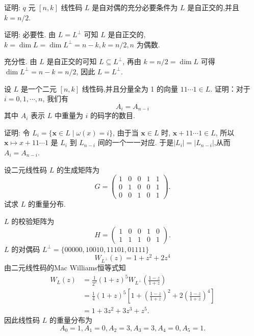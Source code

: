 \begin{exercise}
 证明: $ q $ 元 $ [n, k] $ 线性码 $ L $ 是自对偶的充分必要条件为 $ L $ 是自正交的,并且 $ k=n / 2 $.
\end{exercise}
\begin{solution}
    证明: 必要性. 由 $ L=L ^\perp $ 可知 $ L $ 是自正交的, $ k=\operatorname{dim} L=\operatorname{dim} L^{\perp}=n-k, k=n / 2, n $ 为偶数.

充分性. 由 $ L $ 是自正交的可知 $ L \subseteq L^{\perp} $, 再由 $ k=n / 2=\operatorname{dim} L $ 可得 $ \operatorname{dim} L^{\perp}=n-k=n / 2 $, 因此 $ L=L^{\perp} $.
\end{solution}




\begin{exercise}
设 $ L $ 是一个二元 $ [n, k] $ 线性码,并且分量全为 1 的向量 $ 11 \cdots 1 \in L $. 证明：对于 $ i=0,1, \cdots, n $, 我们有
$$
A_{i}=A_{n-i}
$$
其中 $ A_{i} $ 表示 $ L $ 中重量为 $ i $ 的码字的数目.
\end{exercise}
\begin{solution}
    证明: 令 $ L_{i}=\{\boldsymbol{x} \in L \mid \omega(x)=i\} $, 由于当 $ \boldsymbol{x }\in L $ 时, $ \boldsymbol{x}+11 \cdots 1 \in L $, 所以 $ \boldsymbol{x} \longmapsto x+11 \cdots 1 $ 是 $ L_{i} $ 到 $ L_{n-i} $ 间的一个一一对应. 于是$|L_{i}|=|L_{n-i}|$,从而 $ A_{i}=A_{n-i} $.
\end{solution}



\begin{exercise}
 设二元线性码 $ L $ 的生成矩阵为
$$
G=\left(\begin{array}{lllll}
1 & 0 & 0 & 1 & 1 \\
0 & 1 & 0 & 0 & 1 \\
0 & 0 & 1 & 0 & 1
\end{array}\right) .
$$
试求 $ L $ 的重量分布.
\end{exercise}
\begin{solution}
$ L $ 的校验矩阵为
$$
H=\left(\begin{array}{lllll}
1 & 0 & 0 & 1 & 0 \\
1 & 1 & 1 & 0 & 1
\end{array}\right) .
$$
$ L $ 的对偶码 $ L^{\perp}=\{00000,10010,11101,01111\} $
$$
W_{L^{\perp}}(z)=1+z^{2}+2 z^{4}
$$
由二元线性码的Mac Williams恒等式知
$$
\begin{aligned}
W_{L}(z) & =\frac{1}{2^{2}}(1+z)^{5} W_{L^{\perp}}\left(\frac{1-z}{1+z}\right) \\
& =\frac{1}{4}(1+z)^{5}\left[1+\left(\frac{1-z}{1+z}\right)^{2}+2\left(\frac{1-z}{1+z}\right)^{4}\right] \\
& =1+3 z^{2}+3 z^{3}+z^{5} .
\end{aligned}
$$
因此线性码 $ L $ 的重量分布为
$$
A_{0}=1, A_{1}=0, A_{2}=3, A_{3}=3, A_{4}=0, A_{5}=1 .
$$
\end{solution}


